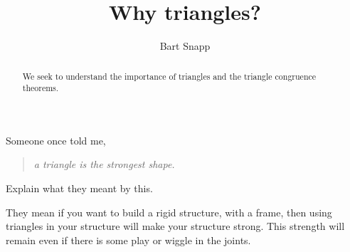 \documentclass{ximera}
\title{Why triangles?}
\author{Bart Snapp}
\begin{document}
\begin{abstract}
  We seek to understand the importance of triangles and the triangle
  congruence theorems.
\end{abstract}
\maketitle


\theoutcomes



\begin{question}
  Someone once told me,
  \begin{quote}
    \textit{a triangle is the strongest shape.}
  \end{quote}
  Explain what they meant by this.
  \begin{freeResponse}
    They mean if you want to build a rigid structure, with a frame,
    then using triangles in your structure will make your structure
    strong. This strength will remain even if there is some play
    or wiggle in the joints.
  \end{freeResponse}
\end{question}
\end{document}
